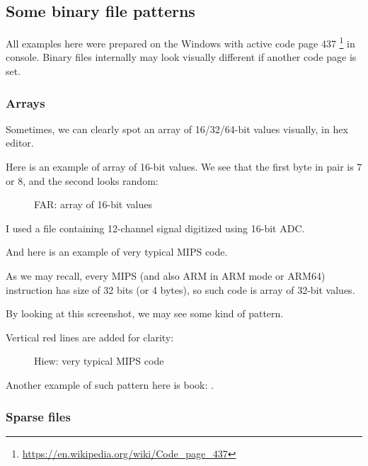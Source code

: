 
\subsection{Some binary file patterns}

All examples here were prepared on the Windows with active code page 437
\footnote{\url{https://en.wikipedia.org/wiki/Code_page_437}} in console.
Binary files internally may look visually different if another code page is set.

\clearpage
\subsubsection{Arrays}

Sometimes, we can clearly spot an array of 16/32/64-bit values visually, in hex editor.

Here is an example of array of 16-bit values.
We see that the first byte in pair is 7 or 8, and the second looks random:

\begin{figure}[H]
\centering
{}
\caption{FAR: array of 16-bit values}
\end{figure}

I used a file containing 12-channel signal digitized using 16-bit \ac{ADC}.

\clearpage
{}
\par And here is an example of very typical MIPS code.

As we may recall, every MIPS (and also ARM in ARM mode or ARM64) instruction has size of 32 bits (or 4 bytes), 
so such code is array of 32-bit values.

By looking at this screenshot, we may see some kind of pattern.

Vertical red lines are added for clarity:

\begin{figure}[H]
\centering
{}
\caption{Hiew: very typical MIPS code}
\end{figure}

Another example of such pattern here is book: 
.

\clearpage
\subsubsection{Sparse files}


